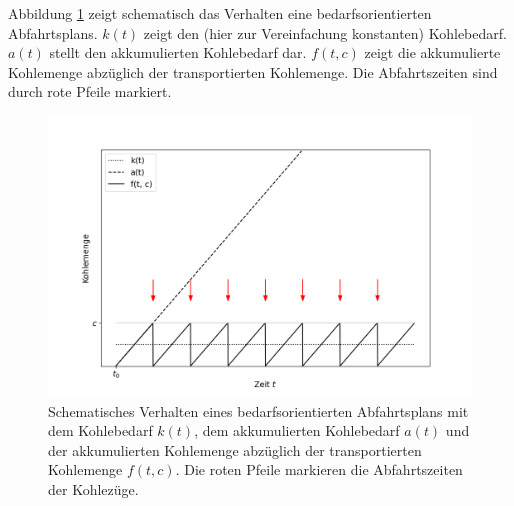 Abbildung \ref{fig:demand-math} zeigt schematisch das Verhalten eine bedarfsorientierten Abfahrtsplans. $k(t)$ zeigt den (hier zur Vereinfachung konstanten) Kohlebedarf. $a(t)$ stellt den akkumulierten Kohlebedarf dar. $f(t,c)$ zeigt die akkumulierte Kohlemenge abzüglich der transportierten Kohlemenge. Die Abfahrtszeiten sind durch rote Pfeile markiert.

\begin{figure}[htb]
	\centering
	\includegraphics[width=1.0\linewidth]{images/demand-math.png}
	\caption{Schematisches Verhalten eines bedarfsorientierten Abfahrtsplans mit dem Kohlebedarf $k(t)$, dem akkumulierten Kohlebedarf $a(t)$ und der akkumulierten Kohlemenge abzüglich der transportierten Kohlemenge $f(t,c)$. Die roten Pfeile markieren die Abfahrtszeiten der Kohlezüge.}
	\label{fig:demand-math}
\end{figure}